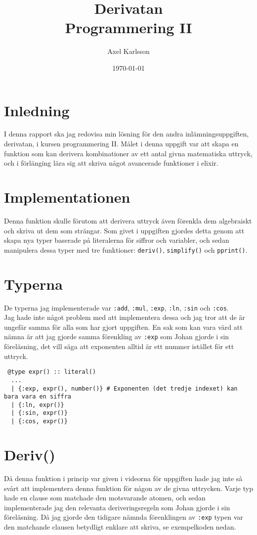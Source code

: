 \documentclass[a4paper,11pt]{article}
\begin{document}
\title{
    \textbf{Derivatan\\
            \small Programmering II}
}
\author{Axel Karlsson}
\date{\today}

\maketitle

\section*{Inledning}
I denna rapport ska jag redovisa min lösning för den andra inlämningsuppgiften, derivatan, i kursen programmering II. Målet i denna uppgift var att skapa en funktion som kan derivera kombinationer av ett antal givna matematiska uttryck, och i förlänging lära sig att skriva något avancerade funktioner i elixir.\\ %

\section*{Implementationen}
Denna funktion skulle förutom att derivera uttryck även förenkla dem algebraiskt och skriva ut dem som strängar. Som givet i uppgiften gjordes detta genom att skapa nya typer baserade på literalerna för siffror och variabler, och sedan manipulera dessa typer med tre funktioner: {\tt deriv()}, {\tt simplify()} och {\tt pprint()}.

\section*{Typerna}
De typerna jag implementerade var {\tt:add}, {\tt:mul}, {\tt:exp}, {\tt:ln}, {\tt:sin} och {\tt:cos}.\\
Jag hade inte något problem med att implementera dessa och jag tror att de är ungefär samma för alla som har gjort uppgiften. En sak som kan vara värd att nämna är att jag gjorde samma förenkling av {\tt:exp} som Johan gjorde i sin föreläsning, det vill säga att exponenten alltid är ett nummer istället för ett uttryck.
\begin{verbatim}
 @type expr() :: literal()
  ...
  | {:exp, expr(), number()} # Exponenten (det tredje indexet) kan bara vara en siffra
  | {:ln, expr()}
  | {:sin, expr()}
  | {:cos, expr()}
\end{verbatim}

\section{Deriv()}
Då denna funktion i princip var given i videorna för uppgiften hade jag inte så svårt att implementera denna funktion för någon av de givna uttrycken. Varje typ hade en clause som matchade den motsvarande atomen, och sedan implementerade jag den relevanta deriveringsregeln som Johan gjorde i sin föreläsning. Då jag gjorde den tidigare nämnda förenklingen av {\tt:exp} typen var den matchande clausen betydligt enklare att skriva, se exempelkoden nedan.
\end{document}
